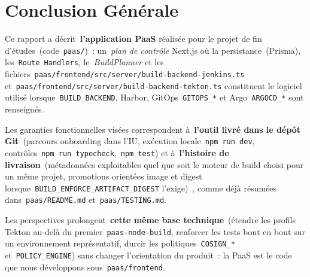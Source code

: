 \chapter*{Conclusion Générale}
\label{ch:conclusion}

Ce rapport a décrit~\textbf{l'application PaaS} réalisée pour le projet de fin d'études~(code~\texttt{paas/})~: un~\emph{plan de contrôle} Next.js où la persistance~(Prisma), les~\texttt{Route Handlers}, le~\emph{BuildPlanner} et les fichiers~\texttt{paas/frontend/src/server/build-backend-jenkins.ts} et~\texttt{paas/frontend/src/server/build-backend-tekton.ts} constituent le logiciel utilisé lorsque~\texttt{BUILD\_BACKEND}, Harbor, GitOps~\texttt{GITOPS\_*} et Argo~\texttt{ARGOCD\_*} sont renseignés.

Les garanties fonctionnelles visées correspondent à~\textbf{l'outil livré dans le dépôt Git}~(parcours onboarding dans l'IU, exécution locale~\texttt{npm run dev}, contrôles~\texttt{npm run typecheck},~\texttt{npm test}) et à~\textbf{l'histoire de livraison}~(métadonnées exploitables quel que soit le moteur de build choisi pour un même projet, promotions orientées image et digest lorsque~\texttt{BUILD\_ENFORCE\_ARTIFACT\_DIGEST} l'exige)~, comme déjà résumées dans~\texttt{paas/README.md} et~\texttt{paas/TESTING.md}.

Les perspectives prolongent~\textbf{cette même base technique}~(étendre les profils Tekton au-delà du premier~\texttt{paas-node-build}, renforcer les tests bout en bout sur un environnement représentatif, durcir les politiques~\texttt{COSIGN\_*} et~\texttt{POLICY\_ENGINE}) sans changer l'orientation du produit~: la PaaS est le code que nous développons sous~\texttt{paas/frontend}.
